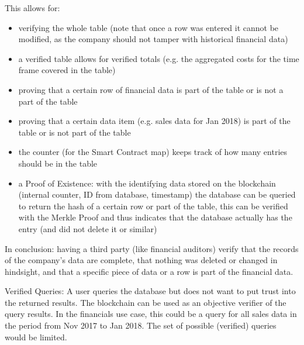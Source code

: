 This allows for:
\begin{itemize}
\item verifying the whole table (note that once a row was entered it cannot be modified, as the company should not tamper with historical financial data)
\item a verified table allows for verified totals (e.g. the aggregated costs for the time frame covered in the table)
\item proving that a certain row of financial data is part of the table or is not a part of the table
\item proving that a certain data item (e.g. sales data for Jan 2018) is part of the table or is not part of the table
\item the counter (for the Smart Contract map) keeps track of how many entries should be in the table
\item a Proof of Existence: with the identifying data stored on the blockchain (internal counter, ID from database, timestamp) the database can be queried to return the hash of a certain row or part of the table, this can be verified with the Merkle Proof and thus indicates that the database actually has the entry (and did not delete it or similar)
\end{itemize}
In conclusion: having a third party (like financial auditors) verify that the records of the company’s data are complete, that nothing was deleted or changed in hindsight, and that a specific piece of data or a row is part of the financial data.

Verified Queries:
A user queries the database but does not want to put trust into the returned results. The blockchain can be used as an objective verifier of the query results.
In the financials use case, this could be a query for all sales data in the period from Nov 2017 to Jan 2018.
The set of possible (verified) queries would be limited.

